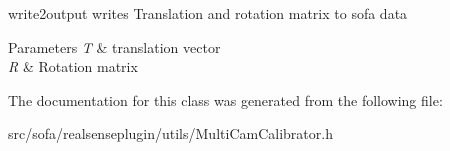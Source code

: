 write2output writes Translation and rotation matrix to sofa data 


\begin{DoxyParams}{Parameters}
{\em T} & translation vector \\
\hline
{\em R} & Rotation matrix \\
\hline
\end{DoxyParams}


The documentation for this class was generated from the following file\+:\begin{DoxyCompactItemize}
\item 
src/sofa/realsenseplugin/utils/Multi\+Cam\+Calibrator.\+h\end{DoxyCompactItemize}
